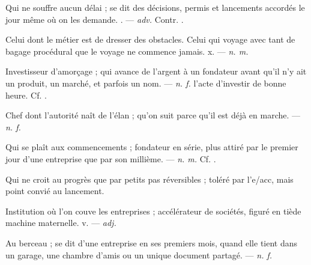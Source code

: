  Qui ne souffre aucun délai ; se dit des décisions, permis et lancements accordés le jour même où on les demande. . ---  \textit{adv.} Contr. .

  Celui dont le métier est de dresser des obstacles.  Celui qui voyage avec tant de bagage procédural que le voyage ne commence jamais.   x. ---  \textit{n. m.}

 Investisseur d'amorçage ; qui avance de l'argent à un fondateur avant qu'il n'y ait un produit, un marché, et parfois un nom. ---  \textit{n. f.} l'acte d'investir de bonne heure. Cf. .

 Chef dont l'autorité naît de l'élan ; qu'on suit parce qu'il est déjà en marche. ---  \textit{n. f.}

 Qui se plaît aux commencements ; fondateur en série, plus attiré par le premier jour d'une entreprise que par son millième. ---  \textit{n. m.} Cf. .

 Qui ne croit au progrès que par petits pas réversibles ; toléré par l'e/acc, mais point convié au lancement.

 Institution où l'on couve les entreprises ; accélérateur de sociétés, figuré en tiède machine maternelle.   v. ---  \textit{adj.}

 Au berceau ; se dit d'une entreprise en ses premiers mois, quand elle tient dans un garage, une chambre d'amis ou un unique document partagé.   ---  \textit{n. f.}

